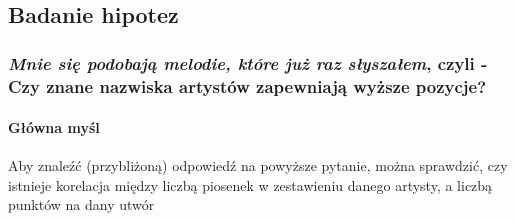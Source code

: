 \documentclass[11pt]{article}
\begin{document}
    \begin{center}
    \end{center}
    { \hspace*{\fill} \\}
    
    \hypertarget{badanie-hipotez}{%
\subsection{Badanie hipotez}\label{badanie-hipotez}}

\hypertarget{mnie-siux119-podobajux105-melodie-ktuxf3re-juux17c-raz-sux142yszaux142em-czyli---czy-znane-nazwiska-artystuxf3w-zapewniajux105-wyux17csze-pozycje}{%
\subsubsection{\texorpdfstring{\emph{Mnie się podobają melodie, które
już raz słyszałem}, czyli - Czy znane nazwiska artystów zapewniają
wyższe
pozycje?}{Mnie się podobają melodie, które już raz słyszałem, czyli - Czy znane nazwiska artystów zapewniają wyższe pozycje?}}\label{mnie-siux119-podobajux105-melodie-ktuxf3re-juux17c-raz-sux142yszaux142em-czyli---czy-znane-nazwiska-artystuxf3w-zapewniajux105-wyux17csze-pozycje}}

\hypertarget{gux142uxf3wna-myux15bl}{%
\paragraph{Główna myśl}\label{gux142uxf3wna-myux15bl}}

Aby znaleźć (przybliżoną) odpowiedź na powyższe pytanie, można
sprawdzić, czy istnieje korelacja między liczbą piosenek w zestawieniu
danego artysty, a liczbą punktów na dany utwór
\end{document}
